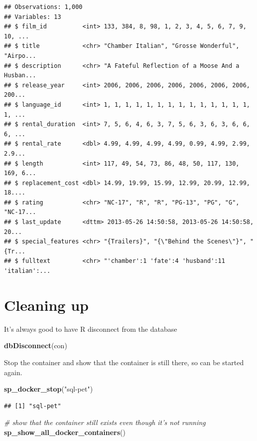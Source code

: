\documentclass[]{book}
\newenvironment{Shaded}{\begin{snugshade}}{\end{snugshade}}
\newcommand{\CommentTok}[1]{\textcolor[rgb]{0.56,0.35,0.01}{\textit{#1}}}
\newcommand{\KeywordTok}[1]{\textcolor[rgb]{0.13,0.29,0.53}{\textbf{#1}}}
\newcommand{\NormalTok}[1]{#1}
\newcommand{\StringTok}[1]{\textcolor[rgb]{0.31,0.60,0.02}{#1}}
\theoremstyle{definition}
\theoremstyle{definition}
\theoremstyle{definition}
\theoremstyle{remark}
\begin{document}
\begin{verbatim}
## Observations: 1,000
## Variables: 13
## $ film_id          <int> 133, 384, 8, 98, 1, 2, 3, 4, 5, 6, 7, 9, 10, ...
## $ title            <chr> "Chamber Italian", "Grosse Wonderful", "Airpo...
## $ description      <chr> "A Fateful Reflection of a Moose And a Husban...
## $ release_year     <int> 2006, 2006, 2006, 2006, 2006, 2006, 2006, 200...
## $ language_id      <int> 1, 1, 1, 1, 1, 1, 1, 1, 1, 1, 1, 1, 1, 1, 1, ...
## $ rental_duration  <int> 7, 5, 6, 4, 6, 3, 7, 5, 6, 3, 6, 3, 6, 6, 6, ...
## $ rental_rate      <dbl> 4.99, 4.99, 4.99, 4.99, 0.99, 4.99, 2.99, 2.9...
## $ length           <int> 117, 49, 54, 73, 86, 48, 50, 117, 130, 169, 6...
## $ replacement_cost <dbl> 14.99, 19.99, 15.99, 12.99, 20.99, 12.99, 18....
## $ rating           <chr> "NC-17", "R", "R", "PG-13", "PG", "G", "NC-17...
## $ last_update      <dttm> 2013-05-26 14:50:58, 2013-05-26 14:50:58, 20...
## $ special_features <chr> "{Trailers}", "{\"Behind the Scenes\"}", "{Tr...
## $ fulltext         <chr> "'chamber':1 'fate':4 'husband':11 'italian':...
\end{verbatim}

\hypertarget{cleaning-up}{%
\section{Cleaning up}\label{cleaning-up}}

It's always good to have R disconnect from the database

\begin{Shaded}
\begin{Highlighting}[]
\KeywordTok{dbDisconnect}\NormalTok{(con)}
\end{Highlighting}
\end{Shaded}

Stop the container and show that the container is still there, so can be
started again.

\begin{Shaded}
\begin{Highlighting}[]
\KeywordTok{sp_docker_stop}\NormalTok{(}\StringTok{"sql-pet"}\NormalTok{)}
\end{Highlighting}
\end{Shaded}

\begin{verbatim}
## [1] "sql-pet"
\end{verbatim}

\begin{Shaded}
\begin{Highlighting}[]
\CommentTok{# show that the container still exists even though it's not running}
\KeywordTok{sp_show_all_docker_containers}\NormalTok{()}
\end{Highlighting}
\end{Shaded}
\end{document}
